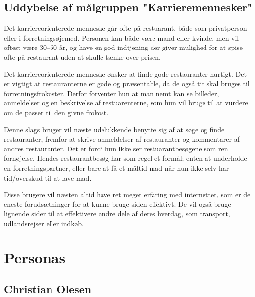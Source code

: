 \documentclass[a4paper, 12pt]{article}
\begin{document}
\subsection{Uddybelse af målgruppen "Karrieremennesker"}
Det karriereorienterede menneske går ofte på restuarant, både som privatperson
eller i forretningsøjemed. Personen kan både være mand eller kvinde, men vil
oftest være 30--50 år, og have en god indtjening der giver mulighed for at spise
ofte på restaurant uden at skulle tænke over prisen.

Det karriereorienterede menneske ønsker at finde gode restauranter hurtigt. Det
er vigtigt at restauranterne er gode og præsentable, da de også tit skal bruges
til forretningsfrokoster. Derfor forventer hun at man nemt kan se billeder,
anmeldelser og en beskrivelse af restuarenterne, som hun vil bruge til at
vurdere om de passer til den givne frokost. 

Denne slags bruger vil næste udelukkende benytte sig af at søge og finde
restauranter, fremfor at skrive anmeldelser af restauranter og kommentarer af
andres restauranter. Det er fordi hun ikke ser restuarantbesøgene som ren
fornøjelse. Hendes restaurantbesøg har som regel et formål; enten at underholde
en forretningspartner, eller bare at få et måltid mad når hun ikke selv har
tid/overskud til at lave mad. 

Disse brugere vil næsten altid have ret meget erfaring med internettet, som er
de eneste forudsætninger for at kunne bruge siden effektivt. De vil også bruge
lignende sider til at effektivere andre dele af deres hverdag, som transport,
udlandsrejser eller indkøb.

\section{Personas}
\label{sec:Personas}

\subsection{Christian Olesen}
\end{document}
